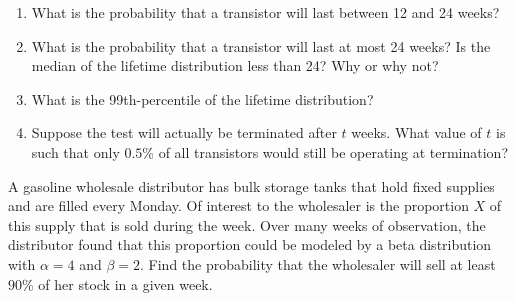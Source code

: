 \documentclass[12pt,reqno]{amsart}
\begin{document}
\medskip
\begin{enumerate}
\item What is the probability that a transistor will last between 12 and 24 weeks?\vfill



\item What is the probability that a transistor will last at most 24 weeks? Is the median of the lifetime distribution less than 24? Why or why not?\vfill



\item What is the 99th-percentile of the lifetime distribution?\vfill



\item Suppose the test will actually be terminated after $t$ weeks. What value of $t$ is such that only $0.5\%$ of all transistors would still be operating at termination?\vfill



\end{enumerate}










\newpage
\prob A gasoline wholesale distributor has bulk storage tanks that hold fixed supplies and are filled every Monday. Of interest to the wholesaler is the proportion $X$ of this supply that is sold during the week. Over many weeks of observation, the distributor found that this proportion could be modeled by a beta distribution with $\alpha = 4$ and $\beta = 2$. Find the probability that the wholesaler will sell at least $90\%$ of her stock in a given week.
\end{document}
